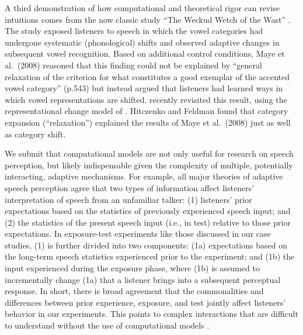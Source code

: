 \documentclass[
  11pt,
  man,floatsintext]{apa6}
\begin{document}
A third demonstration of how computational and theoretical rigor can revise intuitions comes from the now classic study ``The Weckud Wetch of the Wast'' \autocite{maye2008}. The study exposed listeners to speech in which the vowel categories had undergone systematic (phonological) shifts and observed adaptive changes in subsequent vowel recognition. Based on additional control conditions, Maye et al.~(2008) reasoned that this finding could not be explained by ``general relaxation of the criterion for what constitutes a good exemplar of the accented vowel category'' (p.543) but instead argued that listeners had learned ways in which vowel representations are shifted. \textcite{hitczenko-feldman2016} recently revisited this result, using the representational change model of \textcite{kleinschmidt-jaeger2015}. Hitczenko and Feldman found that category expansion (``relaxation'') explained the results of Maye et al.~(2008) just as well as category shift.

We submit that computational models are not only useful for research on speech perception, but likely indispensable given the complexity of multiple, potentially interacting, adaptive mechanisms. For example, all major theories of adaptive speech perception agree that two types of information affect listeners' interpretation of speech from an unfamiliar talker: (1) listeners' prior expectations based on the statistics of previously experienced speech input; and (2) the statistics of the present speech input (i.e., in test) relative to those prior expectations. In exposure-test experiments like those discussed in our case studies, (1) is further divided into two components: (1a) expectations based on the long-term speech statistics experienced prior to the experiment; and (1b) the input experienced during the exposure phase, where (1b) is assumed to incrementally change (1a) that a listener brings into a subsequent perceptual response. In short, there is broad agreement that the commonalities and differences between prior experience, exposure, and test jointly affect listeners' behavior in our experiments. This points to complex interactions that are difficult to understand without the use of computational models \autocites[for further examples and discussion, see][]{apfelbaum-mcmurray2015,sohoglu-davis2016,tan2021,theodore-monto2019,toscano2018,xie2021cognition}.
\end{document}
